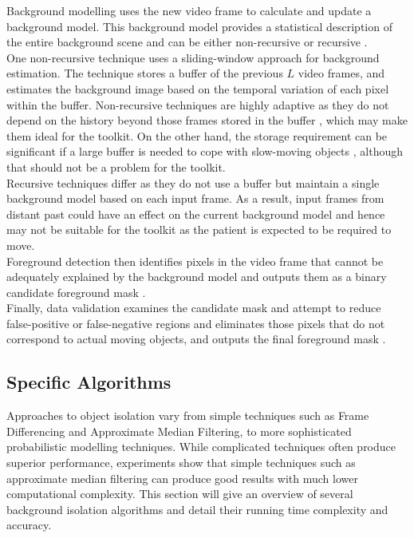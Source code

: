 Background modelling uses the new video frame to calculate and update a background model. This background model provides a statistical description of the entire background scene and can be either non-recursive or recursive \cite{Cheung2007}.\\

One non-recursive technique uses a sliding-window approach for background estimation. The technique stores a buffer of the previous $L$ video frames, and estimates the background image based on the temporal variation of each pixel within the buffer. Non-recursive techniques are highly adaptive as they do not depend on the history beyond those frames stored in the buffer \cite{Cheung2007}, which may make them ideal for the toolkit. On the other hand, the storage requirement can be significant if a large buffer is needed to cope with slow-moving objects \cite{Cheung2007}, although that should not be a problem for the toolkit.\\ 

Recursive techniques differ as they do not use a buffer but maintain a single background model based on each input frame. As a result, input frames from distant past could have an effect on the current background model \cite{Cheung2007} and hence may not be suitable for the toolkit as the patient is expected to be required to move.\\

Foreground detection then identifies pixels in the video frame that cannot be adequately explained by the background model and outputs them as a binary candidate foreground mask \cite{Cheung2007}.\\

Finally, data validation examines the candidate mask and attempt to reduce false-positive or false-negative regions and eliminates those pixels that do not correspond to actual moving objects, and outputs the final foreground mask \cite{Cheung2007}.\\

\subsection{Specific Algorithms}
\label{person_isolation:specific algorithms}
Approaches to object isolation vary from simple techniques such as Frame Differencing and Approximate Median Filtering, to more sophisticated probabilistic modelling techniques. While complicated techniques often produce superior performance, experiments \cite{Cheung2007} show that simple techniques such as approximate median filtering can produce good results with much lower computational complexity. This section will give an overview of several background isolation algorithms and detail their running time complexity and accuracy.\\


